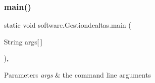 \subsubsection{\texorpdfstring{main()}{main()}}
{\footnotesize\ttfamily static void software.\+Gestiondealtas.\+main (\begin{DoxyParamCaption}\item[{String}]{args\mbox{[}$\,$\mbox{]} }\end{DoxyParamCaption})\hspace{0.3cm}{\ttfamily [inline]}, {\ttfamily [static]}}


\begin{DoxyParams}{Parameters}
{\em args} & the command line arguments \\
\hline
\end{DoxyParams}

